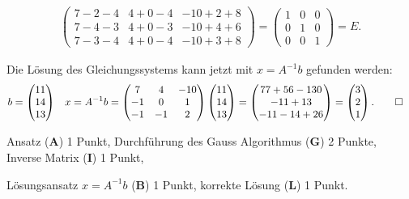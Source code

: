 \begin{loesung}
\begin{teilaufgaben}
\begin{align*}
\begin{pmatrix}
7-2-4&4+0-4&-10+2+8\\
7-4-3&4+0-3&-10+4+6\\
7-3-4&4+0-4&-10+3+8
\end{pmatrix}
=\begin{pmatrix}
1&0&0\\
0&1&0\\
0&0&1
\end{pmatrix}=E.
\end{align*}
\item Die Lösung des Gleichungssystems kann jetzt mit $x=A^{-1}b$ gefunden
werden:
\begin{align*}
b&=
\begin{pmatrix}11\\14\\13\end{pmatrix}
&
x&=A^{-1}b=
\begin{pmatrix}
 7& 4&-10\\
-1& 0&  1\\
-1&-1&  2
\end{pmatrix}
\begin{pmatrix}11\\14\\13\end{pmatrix}
=
\begin{pmatrix}
77+56-130\\
-11+13\\
-11-14+26
\end{pmatrix}
=
\begin{pmatrix}
3\\
2\\
1
\end{pmatrix}.
\qedhere
\end{align*}
\end{teilaufgaben}
\end{loesung}

\begin{bewertung}
\begin{teilaufgaben}
\item
Ansatz (\textbf{A}) 1 Punkt,
Durchführung des Gauss Algorithmus (\textbf{G}) 2 Punkte,
Inverse Matrix (\textbf{I}) 1 Punkt,
\item
Lösungsansatz $x=A^{-1}b$ (\textbf{B}) 1 Punkt,
korrekte Lösung (\textbf{L}) 1 Punkt.
\end{teilaufgaben}
\end{bewertung}

